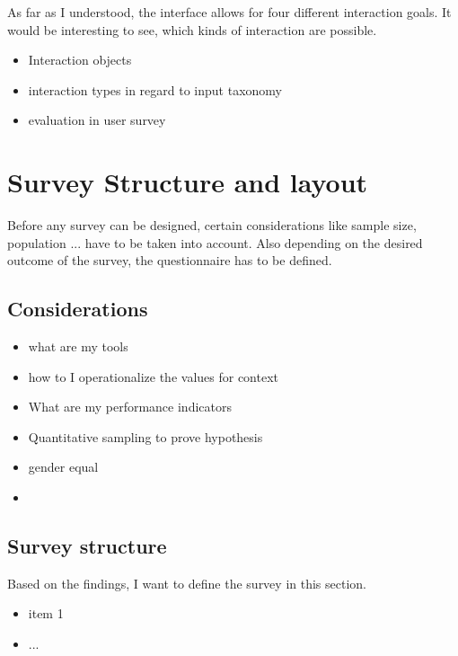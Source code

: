             As far as I understood, the interface allows for four different interaction goals. It would be interesting to see, which kinds of interaction are possible.                

            \begin{itemize}
                \item Interaction objects
                \item interaction types in regard to input taxonomy
                \item evaluation in user survey
            \end{itemize}

    \chapter{Survey Structure and layout}

        Before any survey can be designed, certain considerations like sample size, population ... 
        have to be taken into account. Also depending on the desired outcome of the survey, the questionnaire has to be defined.

        \section{Considerations}

            \begin{itemize}
                \item what are my tools
                \item how to I operationalize the values for context
                \item What are my performance indicators
                \item Quantitative sampling to prove hypothesis
                \item gender equal
                \item 
            \end{itemize}

        \section{Survey structure}

            Based on the findings, I want to define the survey in this section.

            \begin{itemize}
                \item item 1
                \item ...
            \end{itemize}

